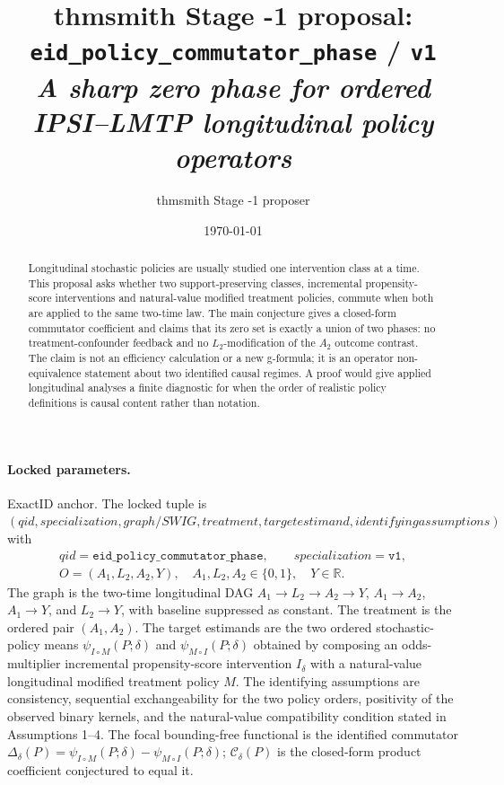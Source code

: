 \documentclass[11pt]{article}
\title{thmsmith Stage -1 proposal: \texttt{eid\_policy\_commutator\_phase} / \texttt{v1}\\ \large\textit{A sharp zero phase for ordered IPSI--LMTP longitudinal policy operators}}
\author{thmsmith Stage -1 proposer}
\date{\today}
\theoremstyle{definition}
\theoremstyle{plain}
\theoremstyle{remark}
\begin{document}
\maketitle


\paragraph{Locked parameters.}
ExactID anchor. The locked tuple is $(qid, specialization, graph/SWIG, treatment, target estimand, identifying assumptions)$ with
\[
\begin{gathered}
qid=\texttt{eid\_policy\_commutator\_phase},\qquad specialization=\texttt{v1},\\
O=(A_1,L_2,A_2,Y),\quad A_1,L_2,A_2\in\{0,1\},\quad Y\in\mathbb R .
\end{gathered}
\]
The graph is the two-time longitudinal DAG $A_1\to L_2\to A_2\to Y$, $A_1\to A_2$, $A_1\to Y$, and $L_2\to Y$, with baseline suppressed as constant. The treatment is the ordered pair $(A_1,A_2)$. The target estimands are the two ordered stochastic-policy means $\psi_{I\circ M}(P;\delta)$ and $\psi_{M\circ I}(P;\delta)$ obtained by composing an odds-multiplier incremental propensity-score intervention $I_\delta$ with a natural-value longitudinal modified treatment policy $M$. The identifying assumptions are consistency, sequential exchangeability for the two policy orders, positivity of the observed binary kernels, and the natural-value compatibility condition stated in Assumptions 1--4. The focal bounding-free functional is the identified commutator $\Delta_\delta(P)=\psi_{I\circ M}(P;\delta)-\psi_{M\circ I}(P;\delta)$; $\mathcal C_\delta(P)$ is the closed-form product coefficient conjectured to equal it.

\begin{abstract}
Longitudinal stochastic policies are usually studied one intervention class at a time. This proposal asks whether two support-preserving classes, incremental propensity-score interventions and natural-value modified treatment policies, commute when both are applied to the same two-time law. The main conjecture gives a closed-form commutator coefficient and claims that its zero set is exactly a union of two phases: no treatment-confounder feedback and no $L_2$-modification of the $A_2$ outcome contrast. The claim is not an efficiency calculation or a new g-formula; it is an operator non-equivalence statement about two identified causal regimes. A proof would give applied longitudinal analyses a finite diagnostic for when the order of realistic policy definitions is causal content rather than notation.
\end{abstract}
\end{document}
